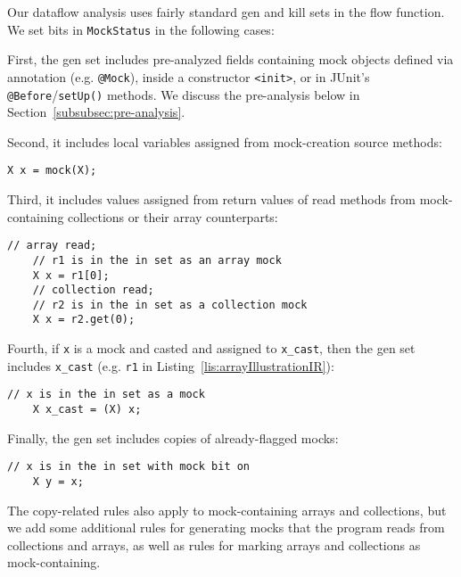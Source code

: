 

Our dataflow analysis uses fairly standard gen and kill sets in the flow function. We set bits in \texttt{MockStatus} in the following cases:

First, the gen set includes pre-analyzed fields containing mock objects defined via annotation (e.g. \texttt{@Mock}), inside a constructor \texttt{<init>}, or in JUnit's \texttt{@Before}/\texttt{setUp()} methods. We discuss the pre-analysis below in Section~\ref{subsubsec:pre-analysis}. 

Second, it includes local variables assigned from mock-creation source methods:
\begin{lstlisting}[basicstyle=\ttfamily\small,numbers=none]
    X x = mock(X);
\end{lstlisting}
Third, it includes values assigned from return values of read methods from mock-containing collections or their array counterparts:
\begin{lstlisting}[basicstyle=\ttfamily\small,numbers=none]
    // array read;
    // r1 is in the in set as an array mock
    X x = r1[0];
    // collection read;
    // r2 is in the in set as a collection mock
    X x = r2.get(0);
\end{lstlisting}
Fourth, if \texttt{x} is a mock and casted and assigned to \texttt{x\_cast}, then the gen set includes \texttt{x\_cast} (e.g. \texttt{r1} in Listing~\ref{lis:arrayIllustrationIR}):
\begin{lstlisting}[basicstyle=\ttfamily\small,numbers=none]
    // x is in the in set as a mock
    X x_cast = (X) x;
\end{lstlisting}
Finally, the gen set includes copies of already-flagged mocks:
\begin{lstlisting}[basicstyle=\ttfamily\small,numbers=none]
    // x is in the in set with mock bit on
    X y = x;
\end{lstlisting}
The copy-related rules also apply to mock-containing arrays and collections, but we add some additional rules for generating mocks that the program reads from collections and arrays, as well as rules for marking arrays and collections as mock-containing.

